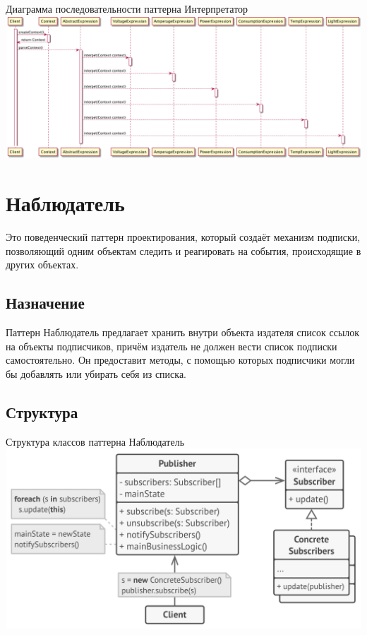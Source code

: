 \documentclass[PI,LAB]{HSEUniversity}
\begin{document}
\begin{FIGURE}[h]{Диаграмма последовательности паттерна Интерпретатор\label{fig:example-figure}}
    \includegraphics[width=1\textwidth]{../out/diagrams/interpreter-ts/interpreter-ts}
\end{FIGURE}
\chapter{Наблюдатель}
Это поведенческий паттерн проектирования, который создаёт механизм подписки, позволяющий одним объектам следить и реагировать на события, происходящие в других объектах.
\section{Назначение}
Паттерн Наблюдатель предлагает хранить внутри объекта издателя список ссылок на объекты подписчиков, причём издатель не должен вести список подписки самостоятельно. Он предоставит методы, с помощью которых подписчики могли бы добавлять или убирать себя из списка.
\section{Структура}

\begin{FIGURE}[h]{Структура классов паттерна Наблюдатель\label{fig:example-figure}}
    \includegraphics[width=1\textwidth]{../out/observer}
\end{FIGURE}
\end{document}

